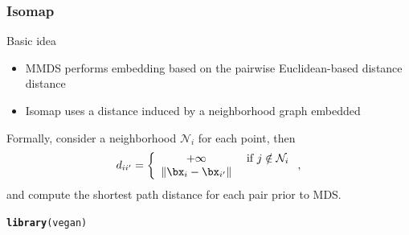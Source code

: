 \documentclass{beamer}\usepackage[]{graphicx}\usepackage[]{color}
\makeatletter
\newcommand{\hlstd}[1]{\textcolor[rgb]{0.345,0.345,0.345}{#1}}%
\newcommand{\hlkwd}[1]{\textcolor[rgb]{0.737,0.353,0.396}{\textbf{#1}}}%
\newenvironment{kframe}{%
 \def\at@end@of@kframe{}%
 \ifinner\ifhmode%
  \def\at@end@of@kframe{\end{minipage}}%
  \begin{minipage}{\columnwidth}%
 \fi\fi%
 \def\FrameCommand##1{\hskip\@totalleftmargin \hskip-\fboxsep
 \colorbox{shadecolor}{##1}\hskip-\fboxsep
     \hskip-\linewidth \hskip-\@totalleftmargin \hskip\columnwidth}%
 \MakeFramed {\advance\hsize-\width
   \@totalleftmargin\z@ \linewidth\hsize
   \@setminipage}}%
 {\par\unskip\endMakeFramed%
 \at@end@of@kframe}
\newenvironment{knitrout}{}{} %
\makeatother
\begin{document}
\begin{frame}
   \frametitle{Isomap}
 
   \begin{block}{Basic idea}
     \begin{itemize}
       \item MMDS performs embedding based on the pairwise Euclidean-based distance distance
       \item Isomap uses a distance induced by a neighborhood graph embedded
     \end{itemize}
   \end{block}
 
Formally, consider a neighborhood $\mathcal{N}_i$ for each point, then
\begin{equation*}
  d_{ii'} = \left\{
    \begin{array}{cc}
    + \infty & \text{ if }j \notin \mathcal{N}_i\\
    \| \bx_i - \bx_{i'} \|& \\
    \end{array}
  \right.,
\end{equation*}
 and compute the shortest path distance for each pair prior to MDS.
 
\begin{knitrout}\scriptsize
{}\color{fgcolor}\begin{kframe}
\begin{alltt}
\hlkwd{library}\hlstd{(vegan)}
\end{alltt}
\end{kframe}
\end{knitrout}
% 
\end{frame}
\end{document}
